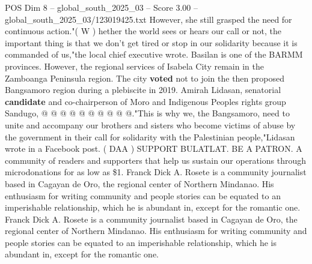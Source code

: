 \begin{textsample}{POS Dim 8 – global\_south\_2025\_03 – Score 3.00 – global\_south\_2025\_03/123019425.txt}
However, she still grasped the need for continuous action."( W ) hether the world sees or hears our call or not, the important thing is that we don't get tired or stop in our solidarity because it is commanded of us,"the local chief executive wrote.
Basilan is one of the BARMM provinces.
However, the regional services of Isabela City remain in the Zamboanga Peninsula region.
The city \textbf{voted} not to join the then proposed Bangsamoro region during a plebiscite in 2019.
Amirah Lidasan, senatorial \textbf{candidate} and co-chairperson of Moro and Indigenous Peoples rights group Sandugo, @ @ @ @ @ @ @ @ @ @."This is why we, the Bangsamoro, need to unite and accompany our brothers and sisters who become victims of abuse by the government in their call for solidarity with the Palestinian people,"Lidasan wrote in a Facebook post. ( DAA ) SUPPORT BULATLAT.
BE A PATRON.
A community of readers and supporters that help us sustain our operations through microdonations for as low as \$1.
Franck Dick A.
Rosete is a community journalist based in Cagayan de Oro, the regional center of Northern Mindanao.
His enthusiasm for writing community and people stories can be equated to an imperishable relationship, which he is abundant in, except for the romantic one.
Franck Dick A.
Rosete is a community journalist based in Cagayan de Oro, the regional center of Northern Mindanao.
His enthusiasm for writing community and people stories can be equated to an imperishable relationship, which he is abundant in, except for the romantic one.

\end{textsample}
